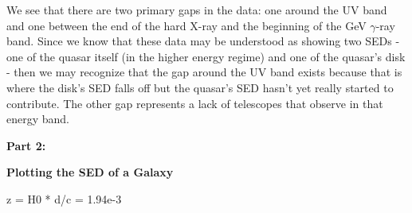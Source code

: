 \documentclass[12pt]{article}
\begin{document}
\begin{onehalfspacing}
We see that there are two primary gaps in the data: one around the UV band and one between the end of the hard X-ray and the beginning of the GeV $\gamma$-ray band. Since we know that these data may be understood as showing two SEDs - one of the quasar itself (in the higher energy regime) and one of the quasar's disk - then we may recognize that the gap around the UV band exists because that is where the disk's SED falls off but the quasar's SED hasn't yet really started to contribute. The other gap represents a lack of telescopes that observe in that energy band.




\raggedright{\textbf{\Large Part 2:}}\\
\raggedright{\textbf{\large Plotting the SED of a Galaxy}}


z = H0 * d/c = 1.94e-3















\end{onehalfspacing}
\end{document}
